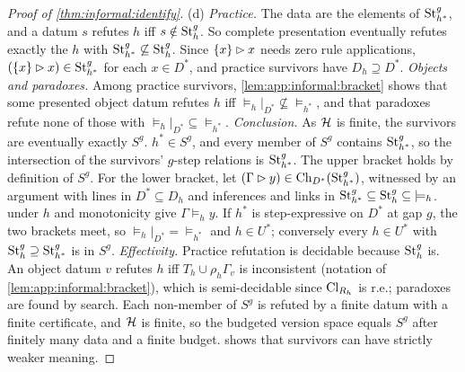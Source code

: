 \begin{proof}[Proof of \cref{thm:informal:identify}]
(d) \emph{Practice.} The data are the elements of $\mathrm{St}^{g}_{h^*}$, and a datum $s$ refutes $h$ iff $s\notin\mathrm{St}^{g}_{h}$. So complete presentation eventually refutes exactly the $h$ with $\mathrm{St}^{g}_{h^*}\not\subseteq\mathrm{St}^{g}_{h}$. Since $\{x\}\rhd x$ needs zero rule applications, $(\{x\}\rhd x)\in\mathrm{St}^{g}_{h^*}$ for each $x\in D^*$, and practice survivors have $D_h\supseteq D^*$.
\emph{Objects and paradoxes.} Among practice survivors, \cref{lem:app:informal:bracket} shows that some presented object datum refutes $h$ iff ${\models_h}|_{D^*}\not\subseteq{\models_{h^*}}$, and that paradoxes refute none of those with ${\models_h}|_{D^*}\subseteq{\models_{h^*}}$.
\emph{Conclusion.} As $\mathcal{H}$ is finite, the survivors are eventually exactly $S^g$. $h^*\in S^g$, and every member of $S^g$ contains $\mathrm{St}^{g}_{h^*}$, so the intersection of the survivors' $g$-step relations is $\mathrm{St}^{g}_{h^*}$. The upper bracket holds by definition of $S^g$. For the lower bracket, let $(\Gamma\rhd y)\in\mathrm{Ch}_{D^*}(\mathrm{St}^{g}_{h^*})$, witnessed by an argument with lines in $D^*\subseteq D_h$ and inferences and links in $\mathrm{St}^{g}_{h^*}\subseteq\mathrm{St}^{g}_{h}\subseteq{\models_h}$.  under $h$ and monotonicity give $\Gamma\models_hy$. If $h^*$ is step-expressive on $D^*$ at gap $g$, the two brackets meet, so ${\models_h}|_{D^*}={\models_{h^*}}$ and $h\in U^*$; conversely every $h\in U^*$ with $\mathrm{St}^{g}_{h}\supseteq\mathrm{St}^{g}_{h^*}$ is in $S^g$.
\emph{Effectivity.} Practice refutation is decidable because $\mathrm{St}^{g}_{h}$ is. An object datum $v$ refutes $h$ iff $T_h\cup\rho_h\Gamma_v$ is inconsistent (notation of \cref{lem:app:informal:bracket}), which is semi-decidable since $\mathrm{Cl}_{R_h}$ is r.e.; paradoxes are found by search. Each non-member of $S^g$ is refuted by a finite datum with a finite certificate, and $\mathcal{H}$ is finite, so the budgeted version space equals $S^g$ after finitely many data and a finite budget.  shows that survivors can have strictly weaker meaning.
\end{proof}

